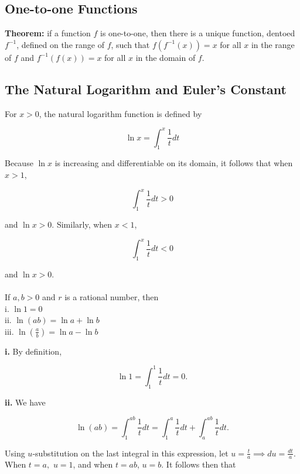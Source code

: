     \subsection{One-to-one Functions}

        \textbf{Theorem:} if a function $f$ is one-to-one, then there is a unique function, dentoed $f^{-1}$, defined on the range of $f$, such that $f\left(f^{-1}(x)\right) = x$ for all $x$ in the range of $f$ and
        $f^{-1}\left(f(x)\right)=x$ for all $x$ in the domain of $f$.


    \subsection{The Natural Logarithm and Euler's Constant}

        For $x>0$, the natural logarithm function is defined by

        \[
            \ln{x} = \int_1^x \frac{1}{t}dt
        \]

        Because $\ln{x}$ is increasing and differentiable on its domain, it follows that when $x>1$,

        \[
            \int_1^x \frac{1}{t}dt > 0
        \]

        and $\ln{x}>0$. Similarly, when $x<1$,

        \[
            \int_1^x \frac{1}{t}dt < 0
        \]

        and $\ln{x}>0$. \\

         \\
        If $a,b>0$ and $r$ is a rational number, then \\
        i. $\ln{1} = 0$ \\
        ii. $\ln{(ab)} = \ln{a} + \ln{b}$ \\
        iii. $\ln{\left(\frac{a}{b}\right)} = \ln{a} - \ln{b}$

        \textbf{i.} By definition,

        \[
            \ln{1} = \int_1^1 \frac{1}{t}dt = 0.
        \]

        \textbf{ii.} We have

        \[
            \ln{\left(ab\right)} = \int_1^{ab} \frac{1}{t}dt = \int_1^a \frac{1}{t}dt + \int_a^{ab} \frac{1}{t}dt.
        \]

        Using $u$-substitution on the last integral in this expression, let $u=\frac{t}{a}\implies du = \frac{dt}{a}$. When $t=a,$ $u=1$, and when $t=ab$, $u=b$. It follows then that

